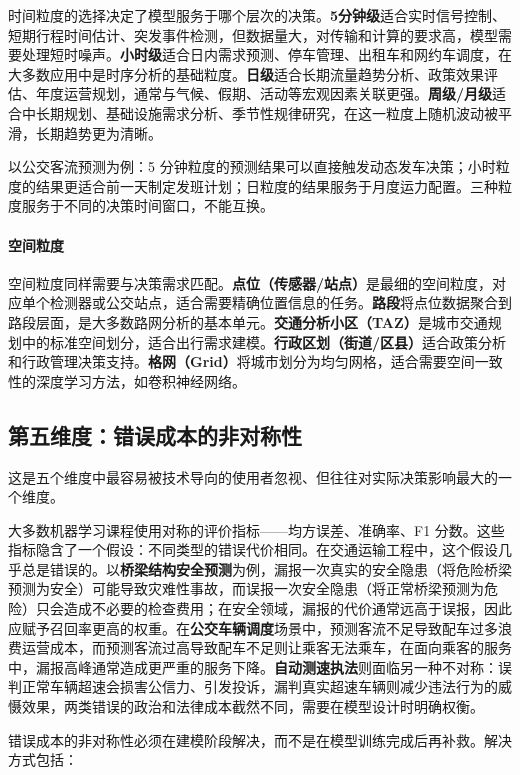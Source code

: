 时间粒度的选择决定了模型服务于哪个层次的决策。\textbf{5分钟级}适合实时信号控制、短期行程时间估计、突发事件检测，但数据量大，对传输和计算的要求高，模型需要处理短时噪声。\textbf{小时级}适合日内需求预测、停车管理、出租车和网约车调度，在大多数应用中是时序分析的基础粒度。\textbf{日级}适合长期流量趋势分析、政策效果评估、年度运营规划，通常与气候、假期、活动等宏观因素关联更强。\textbf{周级/月级}适合中长期规划、基础设施需求分析、季节性规律研究，在这一粒度上随机波动被平滑，长期趋势更为清晰。

以公交客流预测为例：5 分钟粒度的预测结果可以直接触发动态发车决策；小时粒度的结果更适合前一天制定发班计划；日粒度的结果服务于月度运力配置。三种粒度服务于不同的决策时间窗口，不能互换。

\paragraph{空间粒度}

空间粒度同样需要与决策需求匹配。\textbf{点位（传感器/站点）}是最细的空间粒度，对应单个检测器或公交站点，适合需要精确位置信息的任务。\textbf{路段}将点位数据聚合到路段层面，是大多数路网分析的基本单元。\textbf{交通分析小区（TAZ）}是城市交通规划中的标准空间划分，适合出行需求建模。\textbf{行政区划（街道/区县）}适合政策分析和行政管理决策支持。\textbf{格网（Grid）}将城市划分为均匀网格，适合需要空间一致性的深度学习方法，如卷积神经网络。

\subsection{第五维度：错误成本的非对称性}

这是五个维度中最容易被技术导向的使用者忽视、但往往对实际决策影响最大的一个维度。

大多数机器学习课程使用对称的评价指标——均方误差、准确率、F1 分数。这些指标隐含了一个假设：不同类型的错误代价相同。在交通运输工程中，这个假设几乎总是错误的。以\textbf{桥梁结构安全预测}为例，漏报一次真实的安全隐患（将危险桥梁预测为安全）可能导致灾难性事故，而误报一次安全隐患（将正常桥梁预测为危险）只会造成不必要的检查费用；在安全领域，漏报的代价通常远高于误报，因此应赋予召回率更高的权重。在\textbf{公交车辆调度}场景中，预测客流不足导致配车过多浪费运营成本，而预测客流过高导致配车不足则让乘客无法乘车，在面向乘客的服务中，漏报高峰通常造成更严重的服务下降。\textbf{自动测速执法}则面临另一种不对称：误判正常车辆超速会损害公信力、引发投诉，漏判真实超速车辆则减少违法行为的威慑效果，两类错误的政治和法律成本截然不同，需要在模型设计时明确权衡。

错误成本的非对称性必须在建模阶段解决，而不是在模型训练完成后再补救。解决方式包括：

